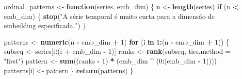 \documentclass[
]{article}
\newenvironment{Shaded}{\begin{snugshade}}{\end{snugshade}}
\newcommand{\AttributeTok}[1]{\textcolor[rgb]{0.13,0.29,0.53}{#1}}
\newcommand{\ControlFlowTok}[1]{\textcolor[rgb]{0.13,0.29,0.53}{\textbf{#1}}}
\newcommand{\DecValTok}[1]{\textcolor[rgb]{0.00,0.00,0.81}{#1}}
\newcommand{\FunctionTok}[1]{\textcolor[rgb]{0.13,0.29,0.53}{\textbf{#1}}}
\newcommand{\NormalTok}[1]{#1}
\newcommand{\OtherTok}[1]{\textcolor[rgb]{0.56,0.35,0.01}{#1}}
\newcommand{\SpecialCharTok}[1]{\textcolor[rgb]{0.81,0.36,0.00}{\textbf{#1}}}
\newcommand{\StringTok}[1]{\textcolor[rgb]{0.31,0.60,0.02}{#1}}
\begin{document}
\begin{Shaded}
\begin{Highlighting}[]
\NormalTok{ordinal\_patterns }\OtherTok{\textless{}{-}} \ControlFlowTok{function}\NormalTok{(series, emb\_dim) \{}
\NormalTok{  n }\OtherTok{\textless{}{-}} \FunctionTok{length}\NormalTok{(series)}
  \ControlFlowTok{if}\NormalTok{ (n }\SpecialCharTok{\textless{}}\NormalTok{ emb\_dim) \{}
    \FunctionTok{stop}\NormalTok{(}\StringTok{"A série temporal é muito curta para a dimensão de embedding especificada."}\NormalTok{)}
\NormalTok{  \}}

\NormalTok{  patterns }\OtherTok{\textless{}{-}} \FunctionTok{numeric}\NormalTok{(n }\SpecialCharTok{{-}}\NormalTok{ emb\_dim }\SpecialCharTok{+} \DecValTok{1}\NormalTok{)}
  \ControlFlowTok{for}\NormalTok{ (i }\ControlFlowTok{in} \DecValTok{1}\SpecialCharTok{:}\NormalTok{(n }\SpecialCharTok{{-}}\NormalTok{ emb\_dim }\SpecialCharTok{+} \DecValTok{1}\NormalTok{)) \{}
\NormalTok{    subseq }\OtherTok{\textless{}{-}}\NormalTok{ series[i}\SpecialCharTok{:}\NormalTok{(i }\SpecialCharTok{+}\NormalTok{ emb\_dim }\SpecialCharTok{{-}} \DecValTok{1}\NormalTok{)]}
\NormalTok{    ranks }\OtherTok{\textless{}{-}} \FunctionTok{rank}\NormalTok{(subseq, }\AttributeTok{ties.method =} \StringTok{"first"}\NormalTok{)}
\NormalTok{    pattern }\OtherTok{\textless{}{-}} \FunctionTok{sum}\NormalTok{((ranks }\SpecialCharTok{{-}} \DecValTok{1}\NormalTok{) }\SpecialCharTok{*}\NormalTok{ (emb\_dim }\SpecialCharTok{\^{}}\NormalTok{ (}\DecValTok{0}\SpecialCharTok{:}\NormalTok{(emb\_dim }\SpecialCharTok{{-}} \DecValTok{1}\NormalTok{))))}
\NormalTok{    patterns[i] }\OtherTok{\textless{}{-}}\NormalTok{ pattern}
\NormalTok{  \}}
  \FunctionTok{return}\NormalTok{(patterns)}
\NormalTok{\}}
\end{Highlighting}
\end{Shaded}
\end{document}
